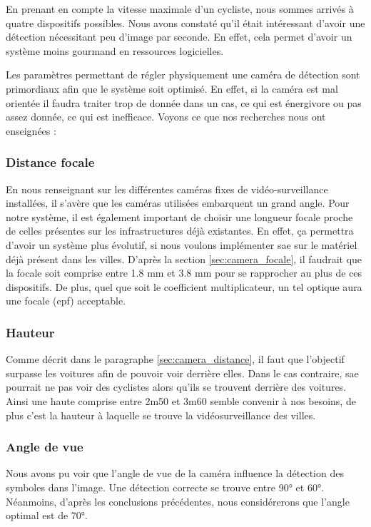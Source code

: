 En prenant en compte la vitesse maximale d'un cycliste, nous sommes arrivés à quatre dispositifs possibles. Nous avons constaté qu'il était intéressant
d'avoir une détection nécessitant peu d'image par seconde. En effet, cela permet d'avoir un système moins gourmand en ressources logicielles.

Les paramètres permettant de régler physiquement une caméra de détection sont primordiaux afin que le système soit optimisé.
En effet, si la caméra est mal orientée il faudra traiter trop de donnée dans un cas, ce qui est énergivore ou pas assez donnée, ce qui est inefficace.
Voyons ce que nos recherches nous ont enseignées :

\subsubsection*{Distance focale}
En nous renseignant sur les différentes caméras fixes de vidéo-surveillance installées, il s’avère que les caméras utilisées embarquent un grand angle.
Pour notre système, il est également important de choisir une longueur focale proche de celles présentes sur les infrastructures déjà existantes.
En effet, ça permettra d'avoir un système plus évolutif, si nous voulons implémenter \gls{sae} sur le matériel déjà présent dans les villes.
D'après la section \ref{sec:camera_focale}, il faudrait que la focale soit comprise entre 1.8 mm et 3.8 mm pour se rapprocher au plus de ces dispositifs.
De plus, quel que soit le coefficient multiplicateur, un tel optique aura une focale (\gls{epf}) acceptable.

\subsubsection*{Hauteur}

Comme décrit dans le paragraphe \ref{sec:camera_distance}, il faut que l'objectif surpasse les voitures afin de pouvoir voir derrière elles.
Dans le cas contraire, \gls{sae} pourrait ne pas voir des cyclistes alors qu'ils se trouvent derrière des voitures.
Ainsi une haute comprise entre 2m50 et 3m60 semble convenir à nos besoins, de plus c'est la hauteur à laquelle se trouve la vidéosurveillance des villes.

\subsubsection*{Angle de vue}
Nous avons pu voir que l'angle de vue de la caméra influence la détection des symboles dans l'image. Une détection correcte se trouve entre 90° et 60°.
Néanmoins, d'après les conclusions précédentes, nous considérerons que l'angle optimal est de 70°.

